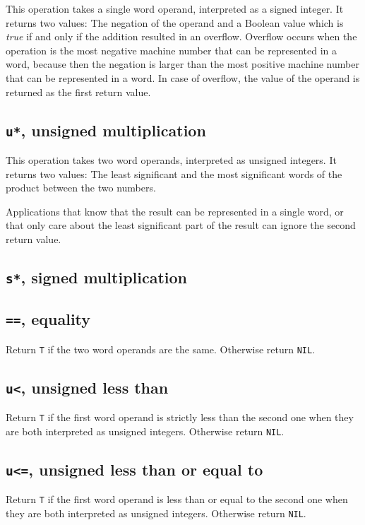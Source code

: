 This operation takes a single word operand, interpreted as a signed
integer.  It returns two values: The negation of the operand and a
Boolean value which is \emph{true} if and only if the addition
resulted in an overflow.  Overflow occurs when the operation is the
most negative machine number that can be represented in a word,
because then the negation is larger than the most positive machine
number that can be represented in a word.  In case of overflow, the
value of the operand is returned as the first return value. 

\subsection{\texttt{u*}, unsigned multiplication}

This operation takes two word operands, interpreted as unsigned
integers.  It returns two values: The least significant and the most
significant words of the product between the two numbers.

Applications that know that the result can be represented in a single
word, or that only care about the least significant part of the result
can ignore the second return value.

\subsection{\texttt{s*}, signed multiplication}

\subsection{\texttt{==}, equality}

Return \texttt{T} if the two word operands are the same.  Otherwise
return \texttt{NIL}.

\subsection{\texttt{u<}, unsigned less than}

Return \texttt{T} if the first word operand is strictly less than the
second one when they are both interpreted as unsigned integers.
Otherwise return \texttt{NIL}.

\subsection{\texttt{u<=}, unsigned less than or equal to}

Return \texttt{T} if the first word operand is less than or equal to
the second one when they are both interpreted as unsigned integers.
Otherwise return \texttt{NIL}.

